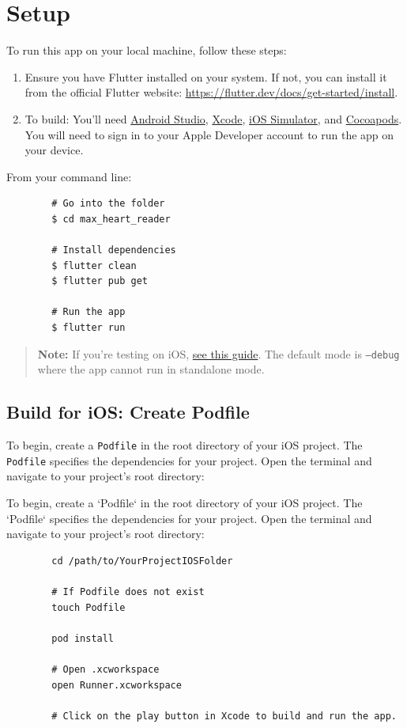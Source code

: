 \documentclass[a4paper]{scrreprt}
\begin{document}
\section{Setup}
To run this app on your local machine, follow these steps:
\begin{enumerate}
    \item Ensure you have Flutter installed on your system. If not, you can install it from
    the official Flutter website: \url{https://flutter.dev/docs/get-started/install}.
    
    \item To build: You'll need \href{https://developer.android.com/studio/}{Android Studio},
    \href{https://developer.apple.com/xcode/}{Xcode}, \href{https://docs.expo.io/workflow/ios-simulator/}{iOS Simulator}, and \href{https://cocoapods.org/}{Cocoapods}. You will need to sign in to your Apple Developer account to run the app on your device.
\end{enumerate}

    From your command line:
    \begin{verbatim}
        # Go into the folder
        $ cd max_heart_reader
        
        # Install dependencies
        $ flutter clean
        $ flutter pub get
        
        # Run the app
        $ flutter run
    \end{verbatim}

    \begin{quote}
        \textbf{Note:} If you're testing on iOS, \href{https://docs.flutter.dev/testing/build-modes}{see this guide}. The default mode is \texttt{--debug} where the app cannot run in standalone mode.
    \end{quote}
    
    \subsection*{Build for iOS: Create Podfile}
    
    To begin, create a \texttt{Podfile} in the root directory of your iOS project. The \texttt{Podfile} specifies the dependencies for your project. Open the terminal and navigate to your project's root directory:
    
    
To begin, create a `Podfile` in the root directory of your iOS project. The `Podfile` specifies the dependencies for your project.
Open the terminal and navigate to your project's root directory:
    \begin{verbatim}
        cd /path/to/YourProjectIOSFolder

        # If Podfile does not exist
        touch Podfile

        pod install

        # Open .xcworkspace
        open Runner.xcworkspace
        
        # Click on the play button in Xcode to build and run the app.
    \end{verbatim}
\end{document}
